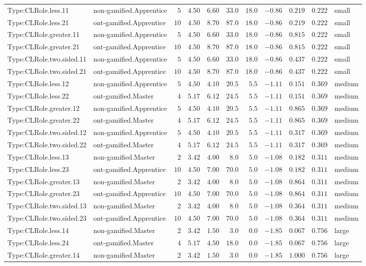 \documentclass[6pt,a4paper]{article}
\begin{document}
{\begin{longtable}{llrrrrrrrrl}
Type:CLRole.less.11&non-gamified.Apprentice&$ 5$&$4.50$&$ 6.60$&$ 33.0$&$18.0$&$-0.86$&$0.219$&$0.222$&small\tabularnewline
Type:CLRole.less.21&ont-gamified.Apprentice&$10$&$4.50$&$ 8.70$&$ 87.0$&$18.0$&$-0.86$&$0.219$&$0.222$&small\tabularnewline
Type:CLRole.greater.11&non-gamified.Apprentice&$ 5$&$4.50$&$ 6.60$&$ 33.0$&$18.0$&$-0.86$&$0.815$&$0.222$&small\tabularnewline
Type:CLRole.greater.21&ont-gamified.Apprentice&$10$&$4.50$&$ 8.70$&$ 87.0$&$18.0$&$-0.86$&$0.815$&$0.222$&small\tabularnewline
Type:CLRole.two.sided.11&non-gamified.Apprentice&$ 5$&$4.50$&$ 6.60$&$ 33.0$&$18.0$&$-0.86$&$0.437$&$0.222$&small\tabularnewline
Type:CLRole.two.sided.21&ont-gamified.Apprentice&$10$&$4.50$&$ 8.70$&$ 87.0$&$18.0$&$-0.86$&$0.437$&$0.222$&small\tabularnewline
Type:CLRole.less.12&non-gamified.Apprentice&$ 5$&$4.50$&$ 4.10$&$ 20.5$&$ 5.5$&$-1.11$&$0.151$&$0.369$&medium\tabularnewline
Type:CLRole.less.22&ont-gamified.Master&$ 4$&$5.17$&$ 6.12$&$ 24.5$&$ 5.5$&$-1.11$&$0.151$&$0.369$&medium\tabularnewline
Type:CLRole.greater.12&non-gamified.Apprentice&$ 5$&$4.50$&$ 4.10$&$ 20.5$&$ 5.5$&$-1.11$&$0.865$&$0.369$&medium\tabularnewline
Type:CLRole.greater.22&ont-gamified.Master&$ 4$&$5.17$&$ 6.12$&$ 24.5$&$ 5.5$&$-1.11$&$0.865$&$0.369$&medium\tabularnewline
Type:CLRole.two.sided.12&non-gamified.Apprentice&$ 5$&$4.50$&$ 4.10$&$ 20.5$&$ 5.5$&$-1.11$&$0.317$&$0.369$&medium\tabularnewline
Type:CLRole.two.sided.22&ont-gamified.Master&$ 4$&$5.17$&$ 6.12$&$ 24.5$&$ 5.5$&$-1.11$&$0.317$&$0.369$&medium\tabularnewline
Type:CLRole.less.13&non-gamified.Master&$ 2$&$3.42$&$ 4.00$&$  8.0$&$ 5.0$&$-1.08$&$0.182$&$0.311$&medium\tabularnewline
Type:CLRole.less.23&ont-gamified.Apprentice&$10$&$4.50$&$ 7.00$&$ 70.0$&$ 5.0$&$-1.08$&$0.182$&$0.311$&medium\tabularnewline
Type:CLRole.greater.13&non-gamified.Master&$ 2$&$3.42$&$ 4.00$&$  8.0$&$ 5.0$&$-1.08$&$0.864$&$0.311$&medium\tabularnewline
Type:CLRole.greater.23&ont-gamified.Apprentice&$10$&$4.50$&$ 7.00$&$ 70.0$&$ 5.0$&$-1.08$&$0.864$&$0.311$&medium\tabularnewline
Type:CLRole.two.sided.13&non-gamified.Master&$ 2$&$3.42$&$ 4.00$&$  8.0$&$ 5.0$&$-1.08$&$0.364$&$0.311$&medium\tabularnewline
Type:CLRole.two.sided.23&ont-gamified.Apprentice&$10$&$4.50$&$ 7.00$&$ 70.0$&$ 5.0$&$-1.08$&$0.364$&$0.311$&medium\tabularnewline
Type:CLRole.less.14&non-gamified.Master&$ 2$&$3.42$&$ 1.50$&$  3.0$&$ 0.0$&$-1.85$&$0.067$&$0.756$&large\tabularnewline
Type:CLRole.less.24&ont-gamified.Master&$ 4$&$5.17$&$ 4.50$&$ 18.0$&$ 0.0$&$-1.85$&$0.067$&$0.756$&large\tabularnewline
Type:CLRole.greater.14&non-gamified.Master&$ 2$&$3.42$&$ 1.50$&$  3.0$&$ 0.0$&$-1.85$&$1.000$&$0.756$&large\tabularnewline

\end{longtable}}
\end{document}
